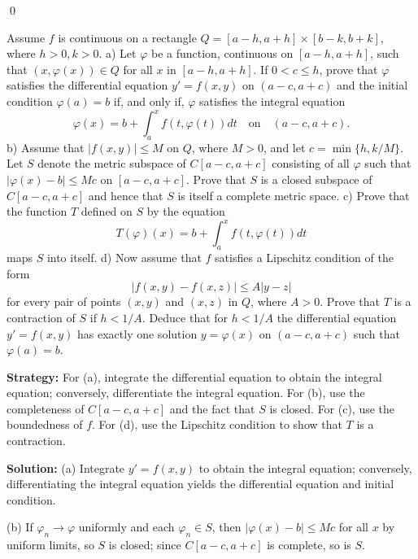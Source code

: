 \qed
\begin{problembox}
\begin{problemstatement}
Assume $f$ is continuous on a rectangle $Q = [a - h, a + h] \times [b - k, b + k]$, where $h > 0, k > 0$.
a) Let $\varphi$ be a function, continuous on $[a - h, a + h]$, such that $(x, \varphi(x)) \in Q$ for all $x$ in $[a - h, a + h]$. If $0 < c \leq h$, prove that $\varphi$ satisfies the differential equation $y' = f(x, y)$ on $(a - c, a + c)$ and the initial condition $\varphi(a) = b$ if, and only if, $\varphi$ satisfies the integral equation 
\[\varphi(x) = b + \int_a^x f(t, \varphi(t)) dt \quad \text{on} \quad (a - c, a + c).\]
b) Assume that $|f(x, y)| \leq M$ on $Q$, where $M > 0$, and let $c = \min \{h, k/M\}$. Let $S$ denote the metric subspace of $C[a - c, a + c]$ consisting of all $\varphi$ such that $|\varphi(x) - b| \leq Mc$ on $[a - c, a + c]$. Prove that $S$ is a closed subspace of $C[a - c, a + c]$ and hence that $S$ is itself a complete metric space.
c) Prove that the function $T$ defined on $S$ by the equation 
\[T(\varphi)(x) = b + \int_a^x f(t, \varphi(t)) dt\]
maps $S$ into itself.
d) Now assume that $f$ satisfies a Lipschitz condition of the form 
\[|f(x, y) - f(x, z)| \leq A|y - z|\]
for every pair of points $(x, y)$ and $(x, z)$ in $Q$, where $A > 0$. Prove that $T$ is a contraction of $S$ if $h < 1/A$. Deduce that for $h < 1/A$ the differential equation $y' = f(x, y)$ has exactly one solution $y = \varphi(x)$ on $(a - c, a + c)$ such that $\varphi(a) = b$.
\end{problemstatement}
\end{problembox}

\noindent\textbf{Strategy:} For (a), integrate the differential equation to obtain the integral equation; conversely, differentiate the integral equation. For (b), use the completeness of $C[a-c,a+c]$ and the fact that $S$ is closed. For (c), use the boundedness of $f$. For (d), use the Lipschitz condition to show that $T$ is a contraction.

\bigskip\noindent\textbf{Solution:}
(a) Integrate $y'=f(x,y)$ to obtain the integral equation; conversely, differentiating the integral equation yields the differential equation and initial condition.

(b) If $\varphi_n\to\varphi$ uniformly and each $\varphi_n\in S$, then $|\varphi(x)-b|\le Mc$ for all $x$ by uniform limits, so $S$ is closed; since $C[a-c,a+c]$ is complete, so is $S$.

